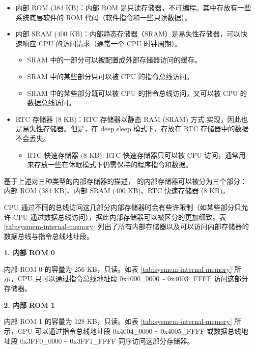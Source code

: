 \documentclass[main\_\_CN.tex]{subfiles}
\begin{document}
\begin{itemize}
    \item 内部 ROM (384 KB)：内部 ROM 是只读存储器，不可编程。其中存放有一些系统底层软件的 ROM 代码（软件指令和一些只读数据）。
    \item 内部 SRAM (400 KB)：内部静态存储器（SRAM）是易失性存储器，可以快速响应 CPU 的访问请求（通常一个 CPU 时钟周期）。
    \begin{itemize}
        \item SRAM 中的一部分可以被配置成外部存储器访问的缓存。
        \item SRAM 中的某些部分只可以被 CPU 的指令总线访问。
        \item SRAM 中的某些部分既可以被 CPU 的指令总线访问，又可以被 CPU 的数据总线访问。
    \end{itemize}
    \item RTC 存储器 (8 KB)：RTC 存储器以静态 RAM (SRAM) 方式 实现，因此也是易失性存储器。但是，在 deep sleep 模式下，存放在 RTC 存储器中的数据不会丢失。
    \begin{itemize}
        \item RTC 快速存储器 (8 KB): 
        RTC 快速存储器只可以被 CPU 访问，通常用来存放一些在休眠模式下仍需保持的程序指令和数据。

    \end{itemize}
\end{itemize}

基于上述对三种类型的内部存储器的描述，\chipname{} 的内部存储器可以被分为三个部分：内部 ROM (384 KB)、内部 SRAM (400 KB)、RTC 快速存储器 (8 KB)。


CPU 通过不同的总线访问这几部分内部存储器时会有些许限制（如某些部分只允许 CPU 通过数据总线访问），据此内部存储器可以被区分的更加细致。表 \ref{tab:sysmem-internal-memory}  列出了所有内部存储器以及可以访问内部存储器的数据总线与指令总线地址段。



{\bfseries 1. 内部 ROM 0}

内部 ROM 0 的容量为 256 KB，只读。如表 \ref{tab:sysmem-internal-memory} 所示，CPU 只可以通过指令总线地址段 0x4000\_0000 \verb+~+ 0x4003\_FFFF 访问这部分存储器。

{\bfseries 2. 内部 ROM 1}

内部 ROM 1 的容量为 128 KB，只读。如表 \ref{tab:sysmem-internal-memory} 所示，CPU 可以通过指令总线地址段 0x4004\_0000 \verb+~+ 0x4005\_FFFF 或数据总线地址段 0x3FF0\_0000 \verb+~+ 0x3FF1\_FFFF 同序访问这部分存储器。
\end{document}
